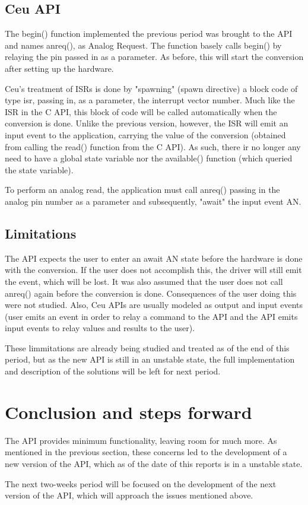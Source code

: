 \documentclass{article}
\begin{document}
\subsection{Ceu API}
\tab The begin() function implemented the previous period was brought to the API and names anreq(), as Analog Request. The function basely calls begin() by relaying the pin passed in as a parameter. As before, this will start the conversion after setting up the hardware.
\par Ceu's treatment of ISRs is done by "spawning" (spawn directive) a block code of type isr, passing in, as a parameter, the interrupt vector number. Much like the ISR in the C API, this block of code will be called automatically when the conversion is done. Unlike the previous version, however, the ISR will emit an input event to the application, carrying the value of the conversion (obtained from calling the read() function from the C API). As such, there ir no longer any need to have a global state variable nor the available() function (which queried the state variable).
\par To perform an analog read, the application must call anreq() passing in the analog pin number as a parameter and subsequently, "await" the input event AN.

\subsection{Limitations}
\tab The API expects the user to enter an await AN state before the hardware is done with the conversion. If the user does not accomplish this, the driver will still emit the event, which will be lost. It was also assumed that the user does not call anreq() again before the conversion is done. Consequences of the user doing this were not studied. Also, Ceu APIs are usually modeled as output and input events (user emits an event in order to relay a command to the API and the API emits input events to relay values and results to the user).
\par These limmitations are already being studied and treated as of the end of this period, but as the new API is still in an unstable state, the full implementation and description of the solutions will be left for next period.

\section{Conclusion and steps forward}
\tab The API provides minimum functionality, leaving room for much more. As mentioned in the previous section, these concerns led to the development of a new version of the API, which as of the date of this reports is in a unstable state.
\par The next two-weeks period will be focused on the development of the next version of the API, which will approach the issues mentioned above.
\end{document}

